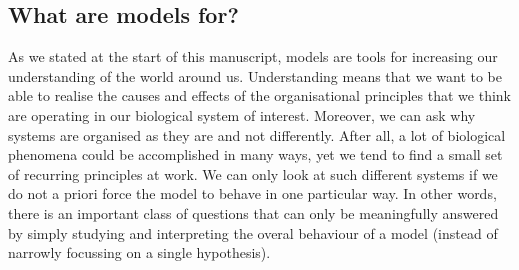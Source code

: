 \subsection{What are models for?}

As we stated at the start of this manuscript, models are tools for increasing our understanding of the world around us. Understanding means that we want to be able to realise the causes and effects of the organisational principles that we think are operating in our biological system of interest. Moreover, we can ask why systems are organised as they are and not differently. After all, a lot of biological phenomena could be accomplished in many ways, yet we tend to find a small set of recurring principles at work. We can only look at such different systems if we do not a priori force the model to behave in one particular way. In other words, there is an important class of questions that can only be meaningfully answered by simply studying and interpreting the overal behaviour of a model (instead of narrowly focussing on a single hypothesis).
  